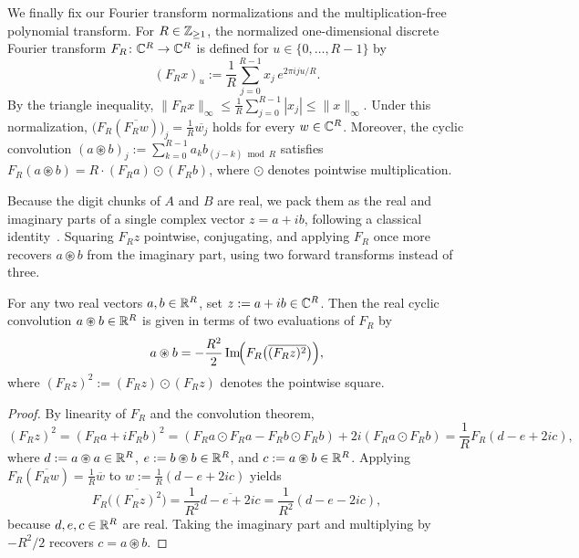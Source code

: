 We finally fix our Fourier transform normalizations and the multiplication-free polynomial transform. For $R \in \mathbb{Z}_{\ge 1}$, the normalized one-dimensional discrete Fourier transform $F_R\colon \mathbb{C}^R \to \mathbb{C}^R$ is defined for $u \in \{0, \dots, R-1\}$ by
\begin{equation}\label{eq:dft-1d}
  (F_R x)_u := \frac{1}{R} \sum_{j=0}^{R-1} x_j \, e^{2\pi i j u / R}.
\end{equation}
By the triangle inequality, $\|F_R x\|_\infty \le \frac{1}{R} \sum_{j=0}^{R-1} |x_j| \le \|x\|_\infty$. Under this normalization, $\bigl(F_R(\overline{F_R w})\bigr)_j = \frac{1}{R} \overline{w_j}$ holds for every $w \in \mathbb{C}^R$. Moreover, the cyclic convolution $(a \circledast b)_j := \sum_{k=0}^{R-1} a_k b_{(j-k)\bmod R}$ satisfies $F_R(a \circledast b) = R \cdot (F_R a) \odot (F_R b)$, where $\odot$ denotes pointwise multiplication.

Because the digit chunks of $A$ and $B$ are real, we pack them as the real and imaginary parts of a single complex vector $z = a + i b$, following a classical identity~\cite{Nussbaumer82}. Squaring $F_R z$ pointwise, conjugating, and applying $F_R$ once more recovers $a \circledast b$ from the imaginary part, using two forward transforms instead of three.

\begin{lemma}\label{lem:two-call}
For any two real vectors $a, b \in \mathbb{R}^R$, set $z := a + i b \in \mathbb{C}^R$. Then the real cyclic convolution $a \circledast b \in \mathbb{R}^R$ is given in terms of two evaluations of $F_R$ by
\begin{equation}\label{eq:two-call}
  a \circledast b = -\frac{R^2}{2} \operatorname{Im}\!\Bigl(F_R\bigl(\overline{(F_R z)^2}\bigr)\Bigr),
\end{equation}
where $(F_R z)^2 := (F_R z) \odot (F_R z)$ denotes the pointwise square.
\end{lemma}

\begin{proof}
By linearity of $F_R$ and the convolution theorem,
\[
  (F_R z)^2 = (F_R a + i F_R b)^2 = (F_R a \odot F_R a - F_R b \odot F_R b) + 2 i (F_R a \odot F_R b) = \frac{1}{R} F_R(d - e + 2 i c),
\]
where $d := a \circledast a \in \mathbb{R}^R$, $e := b \circledast b \in \mathbb{R}^R$, and $c := a \circledast b \in \mathbb{R}^R$. Applying $F_R(\overline{F_R w}) = \frac{1}{R} \overline{w}$ to $w := \frac{1}{R}(d - e + 2 i c)$ yields
\[
  F_R\bigl(\overline{(F_R z)^2}\bigr) = \frac{1}{R^2} \overline{d - e + 2 i c} = \frac{1}{R^2}(d - e - 2 i c),
\]
because $d, e, c \in \mathbb{R}^R$ are real. Taking the imaginary part and multiplying by $-R^2 / 2$ recovers $c = a \circledast b$.
\end{proof}

